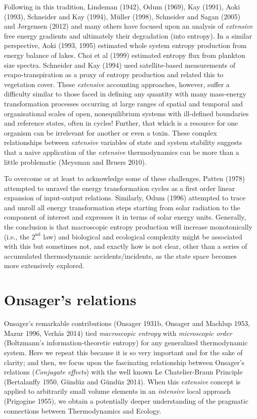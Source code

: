 \documentclass[11pt,letterpaper,]{paper}
\begin{document}
Following in this tradition, Lindeman (1942), Odum (1969), Kay (1991),
Aoki (1993), Schneider and Kay (1994), Müller (1998), Schneider and
Sagan (2005) and Jørgensen (2012) and many others have focused upon an
analysis of \emph{extensive} free energy gradients and ultimately their
degradation (into entropy). In a similar perspective, Aoki (1993, 1995)
estimated whole system entropy production from energy balance of lakes.
Choi et al (1999) estimated entropy flux from plankton size spectra.
Schneider and Kay (1994) used satellite-based measurements of
evapo-transpiration as a proxy of entropy production and related this to
vegetation cover. These \emph{extensive} accounting approaches, however,
suffer a difficulty similar to those faced in defining any quantity with
many mass-energy transformation processes occurring at large ranges of
spatial and temporal and organisational scales of open, nonequilibrium
systems with ill-defined boundaries and reference states, often in
cycles! Further, that which is a resource for one organism can be
irrelevant for another or even a toxin. These complex relationships
between \emph{extensive} variables of state and system stability
suggests that a naive application of the \emph{extensive} thermodynamics
can be more than a little problematic (Meysman and Bruers 2010).

To overcome or at least to acknowledge some of these challenges, Patten
(1978) attempted to unravel the energy transformation cycles as a first
order linear expansion of input-output relations. Similarly, Odum (1996)
attempted to trace and unroll all energy transformation steps starting
from solar radiation to the component of interest and expresses it in
terms of solar energy units. Generally, the conclusion is that
macroscopic entropy production will increase monotonically (i.e., the
\(2^\text{nd}\) law) and biological and ecological complexity might be
associated with this but sometimes not, and exactly how is not clear,
other than a series of accumulated thermodynamic accidents/incidents, as
the state space becomes more extensively explored.

\section{Onsager's relations}\label{onsagers-relations}

Onsager's remarkable contributions (Onsager 1931b, Onsager and Machlup
1953, Mazur 1996, Verhás 2014) tied \emph{macroscopic entropy} with
\emph{microscopic order} (Boltzmann's information-theoretic entropy) for
any generalized thermodynamic system. Here we repeat this because it is
so very important and for the sake of clarity; and then, we focus upon
the fascinating relationship between Onsager's relations
(\emph{Conjugate effects}) with the well known Le Chatelier-Braun
Principle (Bertalanffy 1950, Gündüz and Gündüz 2014). When this
\emph{extensive} concept is applied to arbitrarily small volume elements
in an \emph{intensive} local approach (Prigogine 1955), we obtain a
potentially deeper understanding of the pragmatic connections between
Thermodynamics and Ecology.
\end{document}
